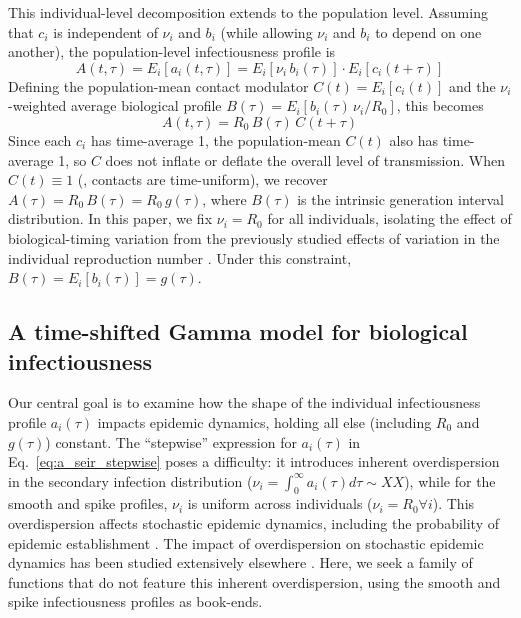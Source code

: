 This individual-level decomposition extends to the population level. Assuming that $c_i$ is independent of $\nu_i$ and $b_i$ (while allowing $\nu_i$ and $b_i$ to depend on one another), the population-level infectiousness profile is
%
\begin{equation}
    A(t, \tau) = E_i[a_i(t,\tau)] = E_i[\nu_i \, b_i(\tau)] \cdot E_i[c_i(t + \tau)]
    \label{eq:A_def_general}
\end{equation}
%
Defining the population-mean contact modulator $C(t) = E_i[c_i(t)]$ and the $\nu_i$-weighted average biological profile $B(\tau) = E_i[b_i(\tau) \, \nu_i / R_0]$, this becomes
%
\begin{equation}
    A(t, \tau) = R_0 \, B(\tau) \, C(t + \tau)
    \label{eq:ABC}
\end{equation}
%
Since each $c_i$ has time-average 1, the population-mean $C(t)$ also has time-average 1, so $C$ does not inflate or deflate the overall level of transmission. When $C(t) \equiv 1$ (\ie, contacts are time-uniform), we recover $A(\tau) = R_0 \, B(\tau) = R_0 \, g(\tau)$, where $B(\tau)$ is the intrinsic generation interval distribution. In this paper, we fix $\nu_i = R_0$ for all individuals, isolating the effect of biological-timing variation from the previously studied effects of variation in the individual reproduction number \citep{lloyd-smith_superspreading_2005}. Under this constraint, $B(\tau) = E_i[b_i(\tau)] = g(\tau)$.


\subsection{A time-shifted Gamma model for biological infectiousness}

Our central goal is to examine how the shape of the individual infectiousness profile $a_i(\tau)$ impacts epidemic dynamics, holding all else (including $R_0$ and $g(\tau)$) constant. The ``stepwise'' expression for $a_i(\tau)$ in Eq.~\ref{eq:a_seir_stepwise} poses a difficulty: it introduces inherent overdispersion in the secondary infection distribution ($\nu_i = \int_0^\infty a_i(\tau) d\tau \sim XX$), while for the smooth and spike profiles, $\nu_i$ is uniform across individuals ($\nu_i = R_0 \forall i$). This overdispersion affects stochastic epidemic dynamics, including the probability of epidemic establishment \citep{lloyd-smith_superspreading_2005}. The impact of overdispersion on stochastic epidemic dynamics has been studied extensively elsewhere \citep{lloyd-smith_superspreading_2005}. Here, we seek a family of functions that do not feature this inherent overdispersion, using the smooth and spike infectiousness profiles as book-ends.

